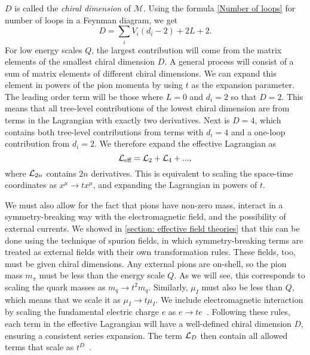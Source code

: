 $D$ is called the \emph{chiral dimension} of $\mathcal M$.
Using the formula \autoref{Number of loops} for number of loops in a Feynman diagram, we get
\begin{equation}
    D = \sum_i V_i(d_i - 2) + 2 L + 2.
\end{equation}
%
For low energy scales $Q$, the largest contribution will come from the matrix elements of the smallest chiral dimension $D$.
A general process will consist of a sum of matrix elements of different chiral dimensions.
We can expand this element in powers of the pion momenta by using $t$ as the expansion parameter.
The leading order term will be those where $L = 0$ and $d_i = 2$ so that $D = 2$.
This means that all tree-level contributions of the lowest chiral dimension are from terms in the Lagrangian with exactly two derivatives.
Next is $D = 4$, which contains both tree-level contributions from terms with $d_i = 4$ and a one-loop contribution from $d_i = 2$.
We therefore expand the effective Lagrangian as
\begin{equation}
    \mathcal{L}_\text{eff} = \mathcal{L}_2 + \mathcal{L}_4 + ...,
\end{equation}
%
where $\mathcal{L}_{2n}$ contains $2n$ derivatives.
This is equivalent to scaling the space-time coordinates as $x^\mu \rightarrow tx^\mu$, and expanding the Lagrangian in powers of $t$.

We must also allow for the fact that pions have non-zero mass, interact in a symmetry-breaking way with the electromagnetic field, and the possibility of external currents.
We showed in \autoref{section: effective field theories} that this can be done using the technique of spurion fields, in which symmetry-breaking terms are treated as external fields with their own transformation rules.
These fields, too, must be given chiral dimensions.
Any external pions are on-shell, so the pion mass $m_\pi$ must be less than the energy scale $Q$.
As we will see, this corresponds to scaling the quark masses as $m_q \rightarrow t^2 m_q$.
Similarly, $\mu_I$ must also be less than $Q$, which means that we scale it as $\mu_I\rightarrow t \mu_I$.
We include electromagnetic interaction by scaling the fundamental electric charge $e$ as $e\rightarrow te$~\autocite{urechVirtualPhotonsChiral1995}.
Following these rules, each term in the effective Lagrangian will have a well-defined chiral dimension $D$, ensuring a consistent series expansion.
The term $\mathcal{L}_{D}$ then contain all allowed terms that scale as $t^D$~\autocite{schererIntroductionChiralPerturbation2002,weinbergPhenomenologicalLagrangians1979a,weinbergQuantumTheoryFields1996}.

